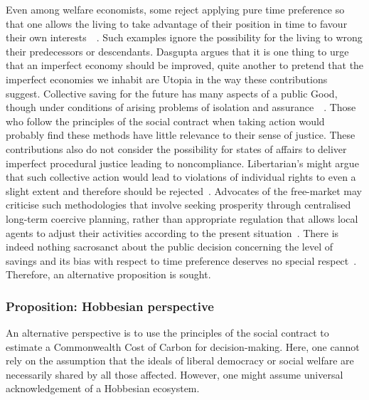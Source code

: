 \documentclass[11pt, oneside]{book}   	%
\begin{document}
Even among welfare economists, some reject applying pure time preference so that one allows the living to take advantage of their position in time to favour their own interests~\cite{hs1}~\cite{fr1}. Such examples ignore the possibility for the living to wrong their predecessors or descendants. Dasgupta argues that it is one thing to urge that an imperfect economy should be improved, quite another to pretend that the imperfect economies we inhabit are Utopia in the way these contributions suggest. Collective saving for the future has many aspects of a public Good, though under conditions of arising problems of isolation and assurance~\cite{as1}~\cite{ms1}.  Those who follow the principles of the social contract when taking action would probably find these methods have little relevance to their sense of justice. These contributions also do not consider the possibility for states of affairs to deliver imperfect procedural justice leading to noncompliance. Libertarian's might argue that such collective action would lead to violations of individual rights to even a slight extent and therefore should be rejected~\cite{rn1}. Advocates of the free-market may criticise such methodologies that involve seeking prosperity through centralised long-term coercive planning, rather than appropriate regulation that allows local agents to adjust their activities according to the present situation~\cite{fh1}. There is indeed nothing sacrosanct about the public decision concerning the level of savings and its bias with respect to time preference deserves no special respect~\cite{jr1}. Therefore, an alternative proposition is sought.

\subsubsection{Proposition: Hobbesian perspective}

An alternative perspective is to use the principles of the social contract to estimate a Commonwealth Cost of Carbon for decision-making.
Here, one cannot rely on the assumption that the ideals of liberal democracy or social welfare are necessarily shared by all those affected.
However, one might assume universal acknowledgement of a Hobbesian ecosystem.
\end{document}
